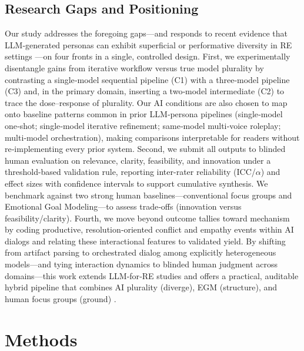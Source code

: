 \documentclass[acmsmall]{acmart}
\begin{document}
\subsection{Research Gaps and Positioning}
\label{sec:gaps}
Our study addresses the foregoing gaps—and responds to recent evidence that LLM‑generated personas can exhibit superficial or performative diversity in RE settings \cite{lazik2025good}—on four fronts in a single, controlled design. First, we experimentally disentangle gains from iterative workflow versus true model plurality by contrasting a single‑model sequential pipeline (C1) with a three‑model pipeline (C3) and, in the primary domain, inserting a two‑model intermediate (C2) to trace the dose–response of plurality. Our AI conditions are also chosen to map onto baseline patterns common in prior LLM‑persona pipelines (single‑model one‑shot; single‑model iterative refinement; same‑model multi‑voice roleplay; multi‑model orchestration), making comparisons interpretable for readers without re‑implementing every prior system. Second, we submit all outputs to blinded human evaluation on relevance, clarity, feasibility, and innovation under a threshold-based validation rule, reporting inter-rater reliability (ICC/$\alpha$) and effect sizes with confidence intervals to support cumulative synthesis. We benchmark against two strong human baselines—conventional focus groups and Emotional Goal Modeling—to assess trade‑offs (innovation versus feasibility/clarity). Fourth, we move beyond outcome tallies toward mechanism by coding productive, resolution‑oriented conflict and empathy events within AI dialogs and relating these interactional features to validated yield. By shifting from artifact parsing to orchestrated dialog among explicitly heterogeneous models—and tying interaction dynamics to blinded human judgment across domains—this work extends LLM‑for‑RE studies and offers a practical, auditable hybrid pipeline that combines AI plurality (diverge), EGM (structure), and human focus groups (ground) \cite{bano2024large,curumsing2014designing,hayes2025conversing}.

\section{Methods}
\label{sec:method:design}
\end{document}
